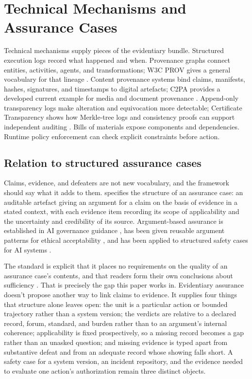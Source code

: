 \section{Technical Mechanisms and Assurance Cases}
\label{sec:technical-mechanisms}

Technical mechanisms supply pieces of the evidentiary bundle. Structured execution logs record what happened and when. Provenance graphs connect entities, activities, agents, and transformations; W3C PROV gives a general vocabulary for that lineage \citep{moreau2013provdm}. Content provenance systems bind claims, manifests, hashes, signatures, and timestamps to digital artefacts; C2PA provides a developed current example for media and document provenance \citep{c2pa2026spec}. Append-only transparency logs make alteration and equivocation more detectable; Certificate Transparency shows how Merkle-tree logs and consistency proofs can support independent auditing \citep{laurie2021certificateTransparencyV2}. Bills of materials expose components and dependencies. Runtime policy enforcement can check explicit constraints before action.

\subsection{Relation to structured assurance cases}

Claims, evidence, and defeaters are not new vocabulary, and the framework should say what it adds to them. \textcite{isoIecIeee2022assuranceCase} specifies the structure of an assurance case: an auditable artefact giving an argument for a claim on the basis of evidence in a stated context, with each evidence item recording its scope of applicability and the uncertainty and credibility of its source. Argument-based assurance is established in AI governance guidance \citep{icoAssuranceCases2026}, has been given reusable argument patterns for ethical acceptability \citep{porter2024praise}, and has been applied to structured safety cases for AI systems \citep{lee2026structuredSafetyCases}.

The standard is explicit that it places no requirements on the quality of an assurance case's contents, and that readers form their own conclusions about sufficiency \citep{isoIecIeee2022assuranceCase}. That is precisely the gap this paper works in. Evidentiary assurance doesn't propose another way to link claims to evidence. It supplies four things that structure alone leaves open: the unit is a particular action or bounded trajectory rather than a system version; the verdicts are relative to a declared record, forum, standard, and burden rather than to an argument's internal coherence; applicability is fixed prospectively, so a missing record becomes a gap rather than an unasked question; and missing evidence is typed apart from substantive defeat and from an adequate record whose showing falls short. A safety case for a system version, an incident repository, and the evidence needed to evaluate one action's authorization remain three distinct objects.

